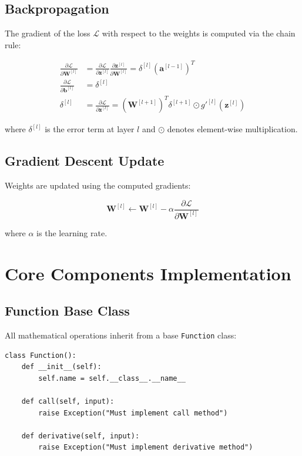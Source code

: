 \documentclass[12pt,a4paper]{article}
\begin{document}
\subsection{Backpropagation}

The gradient of the loss $\mathcal{L}$ with respect to the weights is computed via the chain rule:

\begin{align}
\frac{\partial \mathcal{L}}{\partial \mathbf{W}^{[l]}} &= \frac{\partial \mathcal{L}}{\partial \mathbf{z}^{[l]}} \frac{\partial \mathbf{z}^{[l]}}{\partial \mathbf{W}^{[l]}} = \delta^{[l]} (\mathbf{a}^{[l-1]})^T \\
\frac{\partial \mathcal{L}}{\partial \mathbf{b}^{[l]}} &= \delta^{[l]} \\
\delta^{[l]} &= \frac{\partial \mathcal{L}}{\partial \mathbf{z}^{[l]}} = (\mathbf{W}^{[l+1]})^T \delta^{[l+1]} \odot g'^{[l]}(\mathbf{z}^{[l]})
\end{align}

where $\delta^{[l]}$ is the error term at layer $l$ and $\odot$ denotes element-wise multiplication.

\subsection{Gradient Descent Update}

Weights are updated using the computed gradients:

\begin{equation}
\mathbf{W}^{[l]} \leftarrow \mathbf{W}^{[l]} - \alpha \frac{\partial \mathcal{L}}{\partial \mathbf{W}^{[l]}}
\end{equation}

where $\alpha$ is the learning rate.

\section{Core Components Implementation}

\subsection{Function Base Class}

All mathematical operations inherit from a base \texttt{Function} class:

\begin{lstlisting}[caption={Function base class defining the interface for all operations}]
class Function():
    def __init__(self):
        self.name = self.__class__.__name__
    
    def call(self, input):
        raise Exception("Must implement call method")
    
    def derivative(self, input):
        raise Exception("Must implement derivative method")
\end{lstlisting}
\end{document}
